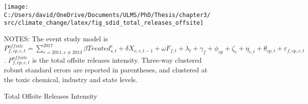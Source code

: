 \begin{figure}[H]
    \centering
    \texttt{[image: C:/Users/david/OneDrive/Documents/ULMS/PhD/Thesis/chapter3/src/climate\_change/latex/fig\_sdid\_total\_releases\_offsite]}
    \caption{Total Offsite Releases Intensity}
    \label{fig:baseline-offsite-total-releases-intensity}
    \begin{minipage}{\columnwidth}
        \vspace{0.05in}
        \tiny NOTES: The event study model is $P_{f,cp,c,t}^{offsite} = \sum_{{e = 2011},{e \neq 2013}}^{2017} \beta Treated_{s,t}^e + \delta X_{v,c,t-1} + \omega F_{f,t} + \lambda_{t} + \gamma_{f} + \phi_{cp} + \zeta_{c} + \eta_{c,t} + \theta_{cp,t} + \varepsilon_{f,cp,c,t}$. $P_{f,cp,c,t}^{offsite}$ is the total offsite releases intensity. Three-way clustered robust standard errors are reported in parentheses, and clustered at the toxic chemical, industry and state levels.
    \end{minipage}
\end{figure}